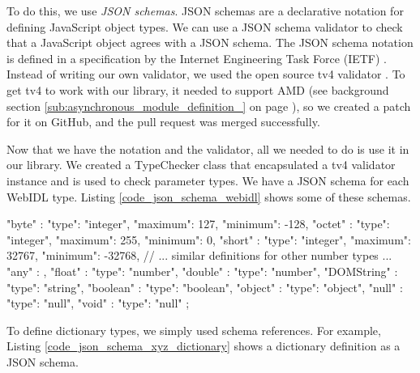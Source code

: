 To do this, we use \emph{JSON schemas}. JSON schemas are a declarative notation for defining JavaScript object types. We can use a JSON schema validator to check that a JavaScript object agrees with a JSON schema. The JSON schema notation is defined in a specification by the Internet Engineering Task Force (IETF) \cite{jsonschemaspec}. Instead of writing our own validator, we used the open source tv4 validator \cite{tvjsonschema}. To get tv4 to work with our library, it needed to support AMD (see background section \ref{sub:asynchronous_module_definition_} on page \pageref{sub:asynchronous_module_definition_}), so we created a patch for it on GitHub, and the pull request was merged successfully. 

Now that we have the notation and the validator, all we needed to do is use it in our library. We created a TypeChecker class that encapsulated a tv4 validator instance and is used to check parameter types. We have a JSON schema for each WebIDL type. Listing \ref{code_json_schema_webidl} shows some of these schemas.

\begin{code}
{
  "byte"               : {"type": "integer", "maximum": 127, 
                                             "minimum": -128},
  "octet"              : {"type": "integer", "maximum": 255, 
                                             "minimum": 0},
  "short"              : {"type": "integer", "maximum": 32767, 
                                             "minimum": -32768},
  // ... similar definitions for other number types ...
  "any"                : {},
  "float"              : {"type": "number"},
  "double"             : {"type": "number"},
  "DOMString"          : {"type": "string"},
  "boolean"            : {"type": "boolean"},
  "object"             : {"type": "object"},
  "null"               : {"type": "null"},
  "void"               : {"type": "null"}
};
\end{code}

To define dictionary types, we simply used schema references. For example, Listing \ref{code_json_schema_xyz_dictionary} shows a dictionary definition as a JSON schema.


